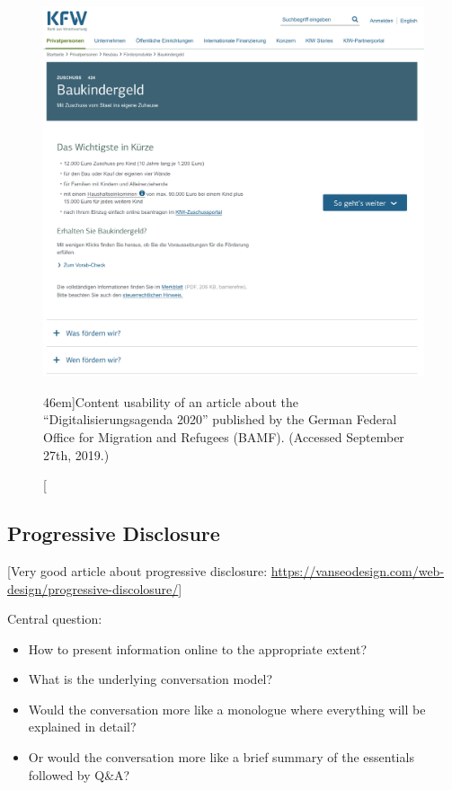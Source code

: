 \begin{figure}%
  \includegraphics[width=1.54\textwidth]{../figures/content_usability_kfw.png}
  \caption[][46em]{Content usability of an article about the ``Digitalisierungsagenda 2020'' published by the German Federal Office for Migration and Refugees (BAMF). (Accessed September 27th, 2019.) }
  \label{fig:content_usability_kfw}
\end{figure}




\subsection{Progressive Disclosure} %
\label{sub:progressive_disclosure}

[Very good article about progressive disclosure: \url{https://vanseodesign.com/web-design/progressive-discolosure/}]

Central question:
\begin{itemize}
	\item How to present information online to the appropriate extent?
	\item What is the underlying conversation model?
	\item Would the conversation more like a monologue where everything will be explained in detail?
	\item Or would the conversation more like a brief summary of the essentials followed by Q\&A?
\end{itemize}
 

